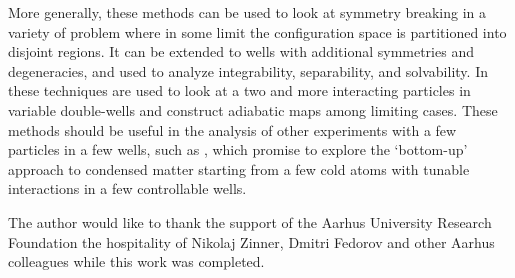 More generally, these methods can be used to look at symmetry breaking in a variety of problem where in some limit the configuration space is partitioned into disjoint regions. It can be extended to wells with additional symmetries and degeneracies, and used to analyze integrability, separability, and solvability. In \cite{harshman2016c} these techniques are used to look at a two and more interacting particles in variable double-wells and construct adiabatic maps among limiting cases. These methods should be useful in the analysis of other experiments with a few particles in a few wells, such as \cite{kaufman2014, kaufman2015}, which promise to explore the `bottom-up' approach to condensed matter starting from a few cold atoms with tunable interactions in a few controllable wells.

\begin{acknowledgements}
The author would like to thank the support of the Aarhus University Research Foundation the hospitality of Nikolaj Zinner, Dmitri Fedorov and other Aarhus colleagues while this work was completed.
\end{acknowledgements}











